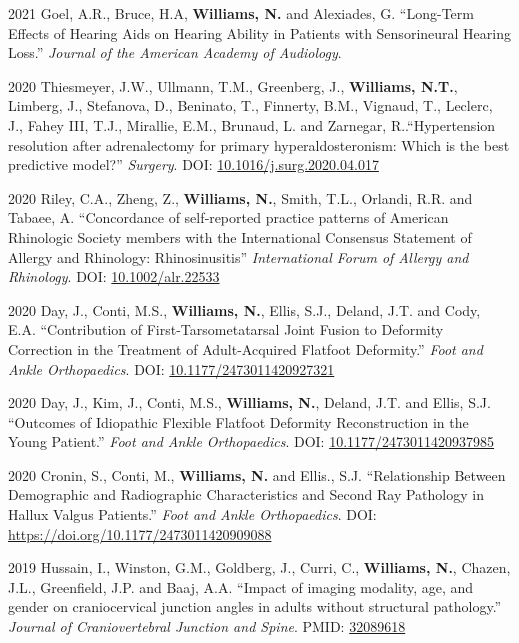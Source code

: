 \documentclass[12pt,letterpaper]{report}
\begin{document}
\begin{tablist}
    \item[2021] \tab Goel, A.R., Bruce, H.A, \textbf{Williams, N.} and Alexiades, G. \enquote{Long-Term Effects of Hearing Aids on Hearing Ability in Patients with Sensorineural Hearing Loss.} \textit{Journal of the American Academy of Audiology}.
    
    \item[2020] \tab Thiesmeyer, J.W., Ullmann, T.M., Greenberg, J., \textbf{Williams, N.T.}, Limberg, J., Stefanova, D., Beninato, T., Finnerty, B.M., Vignaud, T., Leclerc, J., Fahey III, T.J., Mirallie, E.M., Brunaud, L. and Zarnegar, R..\enquote{Hypertension resolution after adrenalectomy for primary hyperaldosteronism: Which is the best predictive model?} \textit{Surgery}. DOI: \href{https://doi.org/10.1016/j.surg.2020.04.017}{10.1016/j.surg.2020.04.017}  
	
	\item[2020] \tab Riley, C.A., Zheng, Z., \textbf{Williams, N.}, Smith, T.L., Orlandi, R.R. and Tabaee, A. \enquote{Concordance of self‐reported practice patterns of American Rhinologic Society members with the International Consensus Statement of Allergy and Rhinology: Rhinosinusitis} \textit{International Forum of Allergy and Rhinology}. DOI: \href{https://doi.org/10.1002/alr.22533}{10.1002/alr.22533} 
	
	\item[2020] \tab Day, J., Conti, M.S., \textbf{Williams, N.}, Ellis, S.J., Deland, J.T. and Cody, E.A. \enquote{Contribution of First-Tarsometatarsal Joint Fusion to Deformity Correction in the Treatment of Adult-Acquired Flatfoot Deformity.} \textit{Foot and Ankle Orthopaedics}. DOI: \href{https://doi.org/10.1177/2473011420927321}{10.1177/2473011420927321}
	
	\item[2020] \tab Day, J., Kim, J., Conti, M.S., \textbf{Williams, N.}, Deland, J.T. and Ellis, S.J. \enquote{Outcomes of Idiopathic Flexible Flatfoot Deformity Reconstruction in the Young Patient.} \textit{Foot and Ankle Orthopaedics}. DOI: \href{https://doi.org/10.1177/2473011420937985}{10.1177/2473011420937985}
	
	\item[2020] \tab Cronin, S., Conti, M., \textbf{Williams, N.} and Ellis., S.J. \enquote{Relationship Between Demographic and Radiographic Characteristics and Second Ray Pathology in Hallux Valgus Patients.} \textit{Foot and Ankle Orthopaedics}. DOI: \href{https://doi.org/10.1177/2473011420909088}{https://doi.org/10.1177/2473011420909088}

	\item[2019] \tab Hussain, I., Winston, G.M., Goldberg, J., Curri, C., \textbf{Williams, N.}, Chazen, J.L., Greenfield, J.P. and Baaj, A.A. \enquote{Impact of imaging modality, age, and gender on craniocervical junction angles in adults without structural pathology.} \textit{Journal of Craniovertebral Junction and Spine}. PMID: \href{https://www.ncbi.nlm.nih.gov/pubmed/32089618}{32089618}

    \end{tablist}
    
\end{document}
